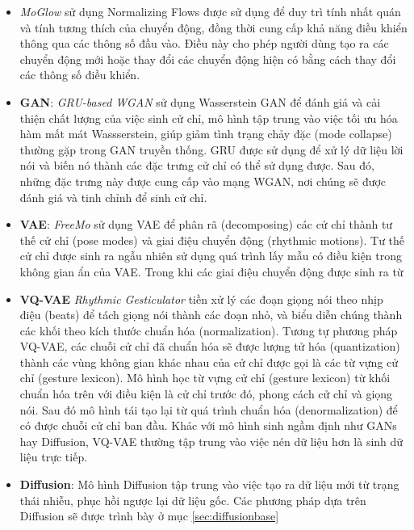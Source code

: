 \begin{itemize}
	\item \textit{MoGlow} \cite{henter2020moglow} sử dụng Normalizing Flows được sử dụng để duy trì tính nhất quán và tính tương thích của chuyển động, đồng thời cung cấp khả năng điều khiển thông qua các thông số đầu vào. Điều này cho phép người dùng tạo ra các chuyển động mới hoặc thay đổi các chuyển động hiện có bằng cách thay đổi các thông số điều khiển.
	
	\item \textbf{GAN}: \textit{GRU-based WGAN} \cite{wu2021probabilistic} sử dụng Wasserstein GAN để đánh giá và cải thiện chất lượng của việc sinh cử chỉ, mô hình tập trung vào việc tối ưu hóa hàm mất mát Wassserstein, giúp giảm tình trạng chảy đặc (mode collapse) thường gặp trong GAN truyền thống. GRU được sử dụng để xử lý dữ liệu lời nói và biến nó thành các đặc trưng cử chỉ có thể sử dụng được. Sau đó, những đặc trưng này được cung cấp vào mạng WGAN, nơi chúng sẽ được đánh giá và tinh chỉnh để sinh cử chỉ.
	
	\item \textbf{VAE}:  \textit{FreeMo} \cite{xu2022freeform} sử dụng VAE để phân rã (decomposing) các cử chỉ thành tư thế cử chỉ (pose modes) và giai điệu chuyển động (rhythmic motions). Tư thế cử chỉ được sinh ra ngẫu nhiên sử dụng quá trình lấy mẫu có điều kiện trong không gian ẩn của VAE. Trong khi các giai điệu chuyển động được sinh ra từ 
	
	\item \textbf{VQ-VAE} \textit{Rhythmic Gesticulator} \cite{ao2022rhythmic} tiền xử lý các đoạn giọng nói theo nhịp điệu (beats) để tách giọng nói thành các đoạn nhỏ, và biểu diễn chúng thành các khối theo kích thước chuẩn hóa (normalization). Tương tự phương pháp VQ-VAE, các chuỗi cử chỉ đã chuẩn hóa sẽ được lượng tử hóa (quantization) thành các vùng không gian khác nhau của cử chỉ được gọi là các từ vựng cử chỉ (gesture lexicon). Mô hình học từ vựng cử chỉ (gesture lexicon) từ khối chuẩn hóa trên với điều kiện là cử chỉ trước đó, phong cách cử chỉ và giọng nói. Sau đó mô hình tái tạo lại từ quá trình chuẩn hóa (denormalization) để có được chuỗi cử chỉ ban đầu. Khác với mô hình sinh ngầm định như GANs hay Diffusion, VQ-VAE thường tập trung vào việc nén dữ liệu hơn là sinh dữ liệu trực tiếp.
	
	\item \textbf{Diffusion}:  Mô hình Diffusion tập trung vào việc tạo ra dữ liệu mới từ trạng thái nhiễu, phục hồi ngược lại dữ liệu gốc. Các phương pháp dựa trên Diffusion sẽ được trình bày ở mục \autoref{sec:diffusionbase}
	
\end{itemize}


